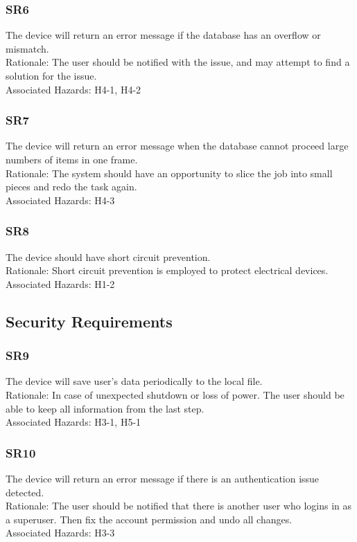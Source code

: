 \documentclass{article}
\begin{document}
\subsubsection{SR6}
The device will return an error message if the database has an overflow or mismatch.\\
Rationale: The user should be notified with the issue, and may attempt to find a solution for the issue.\\
Associated Hazards: H4-1, H4-2
\subsubsection{SR7}
The device will return an error message when the database cannot proceed large numbers of items in one frame.\\
Rationale: The system should have an opportunity to slice the job into small pieces and redo the task again.\\
Associated Hazards: H4-3
\subsubsection{SR8}
The device should have short circuit prevention.\\
Rationale: Short circuit prevention is employed to protect electrical devices.\\
Associated Hazards: H1-2

\subsection{Security Requirements}
\subsubsection{SR9}
The device will save user’s data periodically to the local file.\\
Rationale: In case of unexpected shutdown or loss of power. The user should be able to keep all information from the last step.\\
Associated Hazards: H3-1, H5-1
\subsubsection{SR10}
The device will return an error message if there is an authentication issue detected. \\
Rationale: The user should be notified that there is another user who logins in as a superuser. Then fix the account permission and undo all changes. \\
Associated Hazards: H3-3
\end{document}
